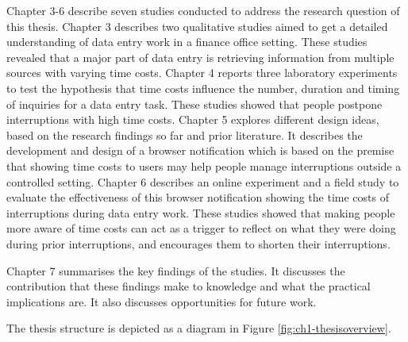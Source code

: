 Chapter 3-6 describe seven studies conducted to address the research question of this thesis. Chapter 3 describes two qualitative studies aimed to get a detailed understanding of data entry work in a finance office setting. These studies revealed that a major part of data entry is retrieving information from multiple sources with varying time costs. Chapter 4 reports three laboratory experiments to test the hypothesis that time costs influence the number, duration and timing of inquiries for a data entry task. These studies showed that people postpone interruptions with high time costs. Chapter 5 explores different design ideas, based on the research findings so far and prior literature. It describes the development and design of a browser notification which is based on the premise that showing time costs to users may help people manage interruptions outside a controlled setting. Chapter 6 describes an online experiment and a field study to evaluate the effectiveness of this browser notification showing the time costs of interruptions during data entry work. These studies showed that making people more aware of time costs can act as a trigger to reflect on what they were doing during prior interruptions, and encourages them to shorten their interruptions.

Chapter 7 summarises the key findings of the studies. It discusses the contribution that these findings make to knowledge and what the practical implications are. It also discusses opportunities for future work. 

The thesis structure is depicted as a diagram in Figure \ref{fig:ch1-thesisoverview}.


